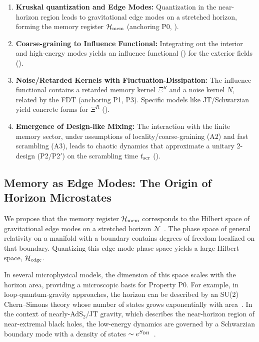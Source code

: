 \documentclass[a4paper,11pt]{article}
\theoremstyle{plain}
\theoremstyle{definition}
\theoremstyle{remark}
\begin{document}
\begin{enumerate}[label=(\roman*)]
    \item \textbf{Kruskal quantization and Edge Modes:} Quantization in the near-horizon region leads to gravitational edge modes on a stretched horizon, forming the memory register $\mathcal{H}_{\rm mem}$ (anchoring P0, ).
    \item \textbf{Coarse-graining to Influence Functional:} Integrating out the interior and high-energy modes yields an influence functional () for the exterior fields ().
    \item \textbf{Noise/Retarded Kernels with Fluctuation-Dissipation:} The influence functional contains a retarded memory kernel $\Xi^R$ and a noise kernel $N$, related by the FDT (anchoring P1, P3). Specific models like JT/Schwarzian yield concrete forms for $\Xi^R$ ().
    \item \textbf{Emergence of Design-like Mixing:} The interaction with the finite memory sector, under assumptions of locality/coarse-graining (A2) and fast scrambling (A3), leads to chaotic dynamics that approximate a unitary 2-design (P2/P2$'$) on the scrambling time $t_{\rm scr}$ ().
\end{enumerate}

\subsection{Memory as Edge Modes: The Origin of Horizon Microstates}
\label{sec:microstates}
We propose that the memory register $\mathcal{H}_{\rm mem}$ corresponds to the Hilbert space of gravitational edge modes on a stretched horizon $\mathcal{N}$~\cite{tHooft:1985, Susskind:1993, Donnelly:2016, Carlip:2017, HopfmullerFreidel:2018}. The phase space of general relativity on a manifold with a boundary contains degrees of freedom localized on that boundary. Quantizing this edge mode phase space yields a large Hilbert space, $\mathcal{H}_{\rm edge}$.

In several microphysical models, the dimension of this space scales with the horizon area, providing a microscopic basis for Property P0. For example, in loop-quantum-gravity approaches, the horizon can be described by an SU(2) Chern--Simons theory whose number of states grows exponentially with area~\cite{Ashtekar:1998, Engle:2010}. In the context of nearly-AdS$_2$/JT gravity, which describes the near-horizon region of near-extremal black holes, the low-energy dynamics are governed by a Schwarzian boundary mode with a density of states $\sim e^{S_{\rm BH}}$~\cite{Almheiri:2015, Maldacena:2016SYK, MSY:2016, Jensen:2016}.
\end{document}
